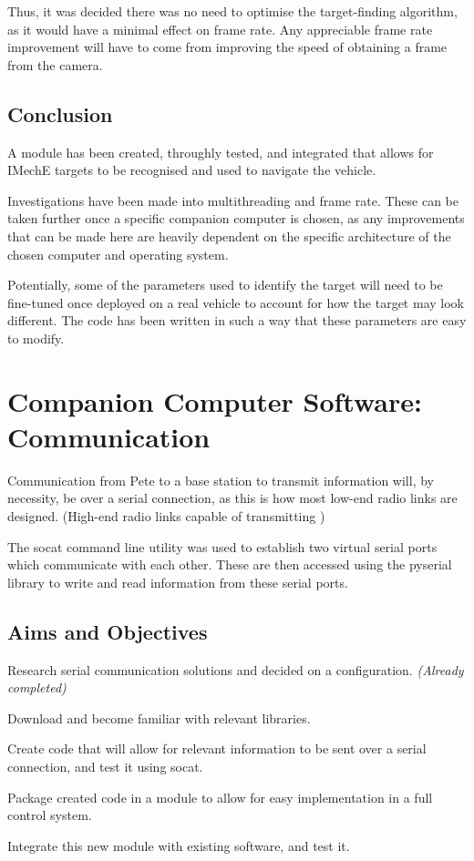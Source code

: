 \documentclass[11pt]{article}
\begin{document}
Thus, it was decided there was no need to optimise the target-finding algorithm, as it would have a minimal effect on frame rate. Any appreciable frame rate improvement will have to come from improving the speed of obtaining a frame from the camera.

\subsection{Conclusion}
A module has been created, throughly tested, and integrated that allows for IMechE targets to be recognised and used to navigate the vehicle.

Investigations have been made into multithreading and frame rate. These can be taken further once a specific companion computer is chosen, as any improvements that can be made here are heavily dependent on the specific architecture of the chosen computer and operating system.

Potentially, some of the parameters used to identify the target will need to be fine-tuned once deployed on a real vehicle to account for how the target may look different. The code has been written in such a way that these parameters are easy to modify.

\section{Companion Computer Software: Communication}
Communication from Pete to a base station to transmit information will, by necessity, be over a serial connection, as this is how most low-end radio links are designed. (High-end radio links capable of transmitting )

The socat command line utility was used to establish two virtual serial ports which communicate with each other. These are then accessed using the pyserial library to write and read information from these serial ports.

\subsection{Aims and Objectives}
\begin{compactenum}
    \item Research serial communication solutions and decided on a configuration. \emph{(Already completed)}
    \item Download and become familiar with relevant libraries.
    \item Create code that will allow for relevant information to be sent over a serial connection, and test it using socat.
    \item Package created code in a module to allow for easy implementation in a full control system.
    \item Integrate this new module with existing software, and test it.
\end{compactenum}
\end{document}
